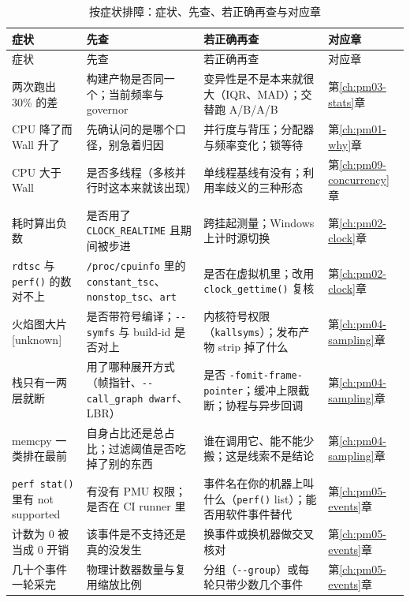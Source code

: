\documentclass[12pt,a4paper,fontset=fandol]{ctexbook}
\newcommand{\Fn}[1]{\texttt{#1()}}
\newcommand{\Tp}[1]{\texttt{#1}}
\newcommand{\Opt}[1]{\texttt{-\/-#1}}
\newcommand{\Bk}{\discretionary{}{}{}}
\newcommand{\Lang}[1]{\textsf{#1}}
\newcommand{\MWall}{\Lang{Wall}}
\newcommand{\MCpu}{\Lang{CPU}}
\newcommand{\Mx}[1]{\textsf{#1}}
\begin{document}
\begin{longtable}{>{\raggedright\arraybackslash}p{}
                  >{\raggedright\arraybackslash}p{}
                  >{\raggedright\arraybackslash}p{}
                  >{\raggedright\arraybackslash}p{}}
\caption{按症状排障：症状、先查、若正确再查与对应章}\label{tab:pmapC-trouble}\\
\toprule
症状 & 先查 & 若正确再查 & 对应章 \\
\midrule
\endfirsthead
\toprule
症状 & 先查 & 若正确再查 & 对应章 \\
\midrule
\endhead
\bottomrule
\endfoot
两次跑出 30\% 的差 & 构建产物是否同一个；当前频率与 governor & 变异性是不是本来就很大（\Mx{IQR}、\Mx{MAD}）；交替跑 A/B/A/B & 第\ref{ch:pm03-stats}章 \\
\MCpu{} 降了而 \MWall{} 升了 & 先确认问的是哪个口径，别急着归因 & 并行度与背压；分配器与频率变化；锁等待 & 第\ref{ch:pm01-why}章 \\
\MCpu{} 大于 \MWall{} & 是否多线程（多核并行时这本来就该出现） & 单线程基线有没有；利用率歧义的三种形态 & 第\ref{ch:pm09-concurrency}章 \\
耗时算出负数 & 是否用了 \Tp{CLOCK\_{\Bk}REALTIME} 且期间被步进 & 跨挂起测量；Windows 上计时源切换 & 第\ref{ch:pm02-clock}章 \\
\Tp{rdtsc} 与 \Fn{perf} 的数对不上 & \Tp{/proc/{\Bk}cpuinfo} 里的 \Tp{constant\_{\Bk}tsc}、\Tp{nonstop\_{\Bk}tsc}、\Tp{art} & 是否在虚拟机里；改用 \Fn{clock\_{\Bk}gettime} 复核 & 第\ref{ch:pm02-clock}章 \\
火焰图大片 \Mx{[unknown]} & 是否带符号编译；\Opt{symfs} 与 \Mx{build-id} 是否对上 & 内核符号权限（\Tp{kallsyms}）；发布产物 strip 掉了什么 & 第\ref{ch:pm04-sampling}章 \\
栈只有一两层就断 & 用了哪种展开方式（帧指针、\Opt{call\_{\Bk}graph dwarf}、LBR） & 是否 \Tp{-fomit{\Bk}-frame-pointer}；缓冲上限截断；协程与异步回调 & 第\ref{ch:pm04-sampling}章 \\
\Mx{memcpy} 一类排在最前 & 自身占比还是总占比；过滤阈值是否吃掉了别的东西 & 谁在调用它、能不能少搬；这是线索不是结论 & 第\ref{ch:pm04-sampling}章 \\
\Fn{perf stat} 里有 not supported & 有没有 PMU 权限；是否在 CI runner 里 & 事件名在你的机器上叫什么（\Fn{perf} list）；能否用软件事件替代 & 第\ref{ch:pm05-events}章 \\
计数为 0 被当成 0 开销 & 该事件是不支持还是真的没发生 & 换事件或换机器做交叉核对 & 第\ref{ch:pm05-events}章 \\
几十个事件一轮采完 & 物理计数器数量与复用缩放比例 & 分组（\Opt{group}）或每轮只带少数几个事件 & 第\ref{ch:pm05-events}章 \\

\end{longtable}
\end{document}
